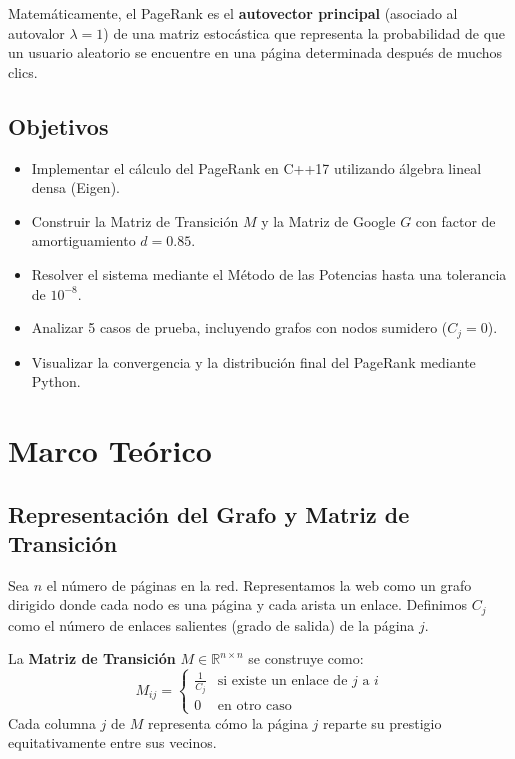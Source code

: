 \documentclass[12pt,a4paper]{article}
\theoremstyle{definition}
\newcommand{\R}{\mathbb{R}}
\begin{document}
Matem\'{a}ticamente, el PageRank es el \textbf{autovector principal} (asociado al autovalor $\lambda = 1$) de una matriz estoc\'{a}stica que representa la probabilidad de que un usuario aleatorio se encuentre en una p\'{a}gina determinada despu\'{e}s de muchos clics.

\subsection{Objetivos}
\begin{itemize}
    \item Implementar el c\'{a}lculo del PageRank en C++17 utilizando \'algebra lineal densa (Eigen).
    \item Construir la Matriz de Transici\'{o}n $M$ y la Matriz de Google $G$ con factor de amortiguamiento $d = 0.85$.
    \item Resolver el sistema mediante el M\'{e}todo de las Potencias hasta una tolerancia de $10^{-8}$.
    \item Analizar 5 casos de prueba, incluyendo grafos con nodos sumidero ($C_j = 0$).
    \item Visualizar la convergencia y la distribuci\'{o}n final del PageRank mediante Python.
\end{itemize}

\section{Marco Te\'{o}rico}\label{sec:teoria}

\subsection{Representaci\'{o}n del Grafo y Matriz de Transici\'{o}n}

Sea $n$ el n\'{u}mero de p\'{a}ginas en la red. Representamos la web como un grafo dirigido donde cada nodo es una p\'{a}gina y cada arista un enlace. Definimos $C_j$ como el n\'{u}mero de enlaces salientes (grado de salida) de la p\'{a}gina $j$. 

La \textbf{Matriz de Transici\'{o}n} $M \in \R^{n \times n}$ se construye como:
\begin{equation}\label{eq:matriz_M}
M_{ij} = \begin{cases} 
\frac{1}{C_j} & \text{si existe un enlace de } j \text{ a } i \\ 
0 & \text{en otro caso}
\end{cases}
\end{equation}
Cada columna $j$ de $M$ representa c\'{o}mo la p\'{a}gina $j$ reparte su prestigio equitativamente entre sus vecinos.
\end{document}

